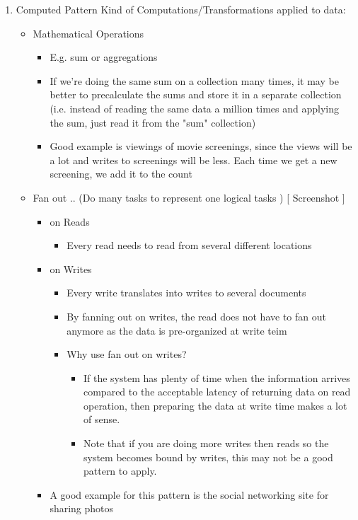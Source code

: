 \documentclass[11pt]{article}
\begin{document}
\begin{enumerate}
\item Computed Pattern
\label{sec:orgd3bca86}
Kind of Computations/Transformations applied to data:
\begin{itemize}
\item Mathematical Operations
\begin{itemize}
\item E.g. sum or aggregations
\item If we're doing the same sum on a collection many times, it may be better to precalculate the sums and store it in a separate collection (i.e. instead of reading the same data a million times and applying the sum, just read it from the "sum" collection)
\item Good example is viewings of movie screenings, since the views will be a lot and writes to screenings will be less. Each time we get a new screening, we add it to the count
\end{itemize}
\item Fan out .. (Do many tasks to represent one logical tasks ) [ Screenshot ]
\begin{itemize}
\item on Reads
\begin{itemize}
\item Every read needs to read from several different locations
\end{itemize}
\item on Writes
\begin{itemize}
\item Every write translates into writes to several documents
\item By fanning out on writes, the read does not have to fan out anymore as the data is pre-organized at write teim
\item Why use fan out on writes?
\begin{itemize}
\item If the system has plenty of time when the information arrives compared to the acceptable latency of returning data on read operation, then preparing the data at write time makes a lot of sense.
\item Note that if you are doing more writes then reads so the system becomes bound by writes, this may not be a good pattern to apply.
\end{itemize}
\end{itemize}
\item A good example for this pattern is the social networking site for sharing photos
\begin{itemize}

\end{itemize}
\end{itemize}
\end{itemize}
\end{enumerate}
\end{document}
